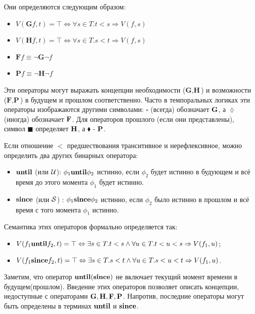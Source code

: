  	Они определяются следующим образом:
 	\begin{itemize}
 		\item $ V(\textbf{G}f,t) = \top \Leftrightarrow \forall s \in T.t<s\Rightarrow V(f,s) $
 		\item $ V(\textbf{H}f,t) = \top \Leftrightarrow \forall s \in T.s<t\Rightarrow V(f,s) $
 		\item $ \textbf{F}f \equiv \neg \textbf{G} \neg f $
 		\item $ \textbf{P}f \equiv \neg \textbf{H} \neg f $
 	\end{itemize}
 	
 	Эти операторы могут выражать концепции необходимости ($ \textbf{G}, \textbf{H} $) и возможности ($ \textbf{F}, \textbf{P} $) в будущем и прошлом соответственно. 
 	Часто в темпоральных логиках эти операторы изображаются другими символами: $ \square $ (всегда) обозначает $ \textbf{G} $, а $ \lozenge $ (иногда) обозначает $ \textbf{F} $.
 	Для операторов прошлого (если они представлены), символ $ \blacksquare $ определяет $ \textbf{H} $, а $ \blacklozenge $ - $ \textbf{P} $.
 	
 	Если отношение $ < $ предшествования транситивное и нерефлексивное, можно определить два других бинарных оператора:
 	\begin{itemize}
 		\item $ \text{\textbf{until}} $ (или $ \mathcal{U} $): $ \phi_1 \text{\textbf{until}} \phi_2 $ истинно, если $ \phi_2 $ будет истинно в будующем и всё время до этого момента $ \phi_1 $ будет истинно.
 		\item $ \text{\textbf{since}} $ (или $ \mathcal{S} $) : $ \phi_1 \text{\textbf{since}} \phi_2 $ истинно, если $ \phi_2 $ было истинно в прошлом и всё время с того момента $ \phi_1 $ истинно. 
 	\end{itemize}
 
 	Семантика этих операторов формально определяется так:
 	\begin{itemize}
 		\item $ V(f_1 \text{\textbf{until}} f_2,t) = \top \Leftrightarrow \exists s \in T . t < s \land \forall u \in T . t < u < s \Rightarrow V(f_1,u) $;
 		\item $ V(f_1\text{\textbf{since}} f_2, t) = \top \Leftrightarrow \exists s \in T . s < t \land \forall u \in T. s < u < t \Rightarrow V(f_1,u) $.
 	\end{itemize}
 
 	Заметим, что оператор $ \text{\textbf{until}}(\text{\textbf{since}}) $ не включает текущий момент времени в будущем(прошлом).
 	Введение этих операторов позволяет описать концепции, недоступные с операторами $ \textbf{G}, \textbf{H}, \textbf{F}, \textbf{P} $.
 	Напротив, последние операторы могут быть определены в терминах $ \text{\textbf{until}} $ и $ \text{\textbf{since}} $.
 	
